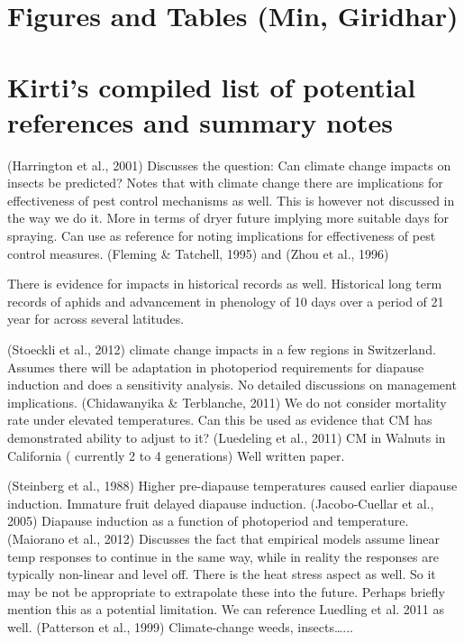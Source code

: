 \documentclass[12pt]{article}
\theoremstyle{plain}
\theoremstyle{definition}
\theoremstyle{definition}
\begin{document}
\section{Figures and Tables (Min, Giridhar)}

\section{Kirti’s compiled list of potential references and summary notes}
(Harrington et al., 2001) Discusses the question: Can 
climate change impacts on insects be predicted?  
Notes that with climate change there are implications 
for effectiveness of pest control mechanisms as well. 
This is however  not discussed in the way we do it. More 
in terms of dryer future implying more suitable days for 
spraying. Can use as reference for noting implications 
for effectiveness of pest control measures.
(Fleming \& Tatchell, 1995) and (Zhou et al., 1996)  

There is evidence for impacts in historical records as 
well. Historical long term records of aphids and 
advancement in phenology of 10 days over a period 
of 21 year for across several latitudes.

(Stoeckli et al., 2012) climate change impacts in a 
few regions in Switzerland. Assumes there will be 
adaptation in photoperiod requirements for diapause
 induction and does a sensitivity analysis. No 
 detailed discussions on management implications.
(Chidawanyika \& Terblanche, 2011) We do not 
consider mortality rate under elevated temperatures. 
Can this be used as evidence that CM has 
demonstrated ability to adjust to it?
(Luedeling et al., 2011) CM in Walnuts in 
California ( currently 2 to 4 generations) 
Well written paper.

(Steinberg et al., 1988) Higher pre-diapause 
temperatures caused earlier diapause induction. 
Immature fruit delayed diapause induction. 
(Jacobo-Cuellar et al., 2005) Diapause induction 
as a function of photoperiod and temperature.
(Maiorano et al., 2012) Discusses the fact that 
empirical models assume linear temp responses 
to continue in the same way, while in reality the 
responses are typically non-linear and level off. 
There is the heat stress aspect as well. So it 
may be not be appropriate to extrapolate these 
into the future. Perhaps briefly mention this as 
a potential limitation. We can reference 
Luedling et al. 2011 as well.
(Patterson et al., 1999) Climate-change 
weeds, insects…...
\end{document}
